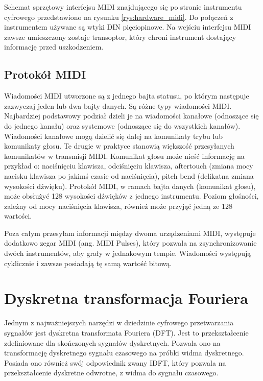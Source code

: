 Schemat sprzętowy interfejsu MIDI znajdującego się po stronie instrumentu cyfrowego przedstawiono na rysunku \ref{rys:hardware_midi}. Do połączeń z instrumentem używane są wtyki DIN pięciopinowe. Na wejściu interfejsu MIDI zawsze umieszczony zostaje transoptor, który chroni instrument dostający informację przed uszkodzeniem.

\subsection{Protokół MIDI}
Wiadomości MIDI utworzone są z jednego bajta statusu, po którym następuje zazwyczaj jeden lub dwa bajty danych. Są różne typy wiadomości MIDI. Najbardziej podstawowy podział dzieli je na wiadomości kanałowe (odnoszące się do jednego kanału) oraz systemowe (odnoszące się do wszystkich kanałów). Wiadomości kanałowe mogą dzielić się dalej na komunikaty trybu lub komunikaty głosu. Te drugie w praktyce stanowią większość przesyłanych komunikatów w transmisji MIDI.
Komunikat głosu może nieść informację na przykład o: naciśnięciu klawisza, odciśnięciu klawisza, aftertouch (zmiana mocy nacisku klawisza po jakimś czasie od naciśnięcia), pitch bend (delikatna zmiana wysokości dźwięku). Protokół MIDI, w ramach bajta danych (komunikat głosu), może obsłużyć 128 wysokości dźwięków z jednego instrumentu. Poziom głośności, zależny od mocy naciśnięcia klawisza, również może przyjąć jedną ze 128 wartości.

Poza całym przesyłam informacji między dwoma urządzeniami MIDI, występuje dodatkowo zegar MIDI (ang. MIDI Pulses), który pozwala na zsynchronizowanie dwóch instrumentów, aby grały w jednakowym tempie. Wiadomości występują cyklicznie i zawsze posiadają tę samą wartość bitową.



\section{Dyskretna transformacja Fouriera}
Jednym z najważniejszych narzędzi w dziedzinie cyfrowego przetwarzania sygnałów jest dyskretna transformata Fouriera (DFT). Jest to przekształcenie zdefiniowane dla skończonych sygnałów dyskretnych. Pozwala ono na transformację dyskretnego sygnału czasowego na próbki widma dyskretnego. Posiada ono również swój odpowiednik zwany IDFT, który pozwala na przekształcenie dyskretne odwrotne, z widma do sygnału czasowego.


